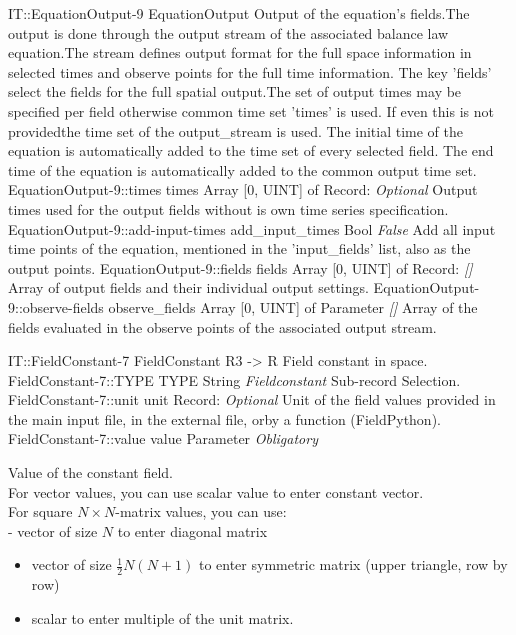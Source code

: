 \begin{RecordType}
	{IT::EquationOutput-9}
	{EquationOutput}
	{} %
	{} %
	{{{Output of the equation's fields.The output is done through the output stream of the associated balance law equation.The stream defines output format for the full space information in selected times and observe points for the full time information. The key 'fields' select the fields for the full spatial output.The set of output times may be specified  per field otherwise common time set 'times' is used. If even this is not providedthe time set of the output{\_}stream is used. The initial time of the equation is automatically added to the time set of every selected field. The end time of the equation is automatically added to the common output time set.}}}
		\RecKey
			{EquationOutput-9::times}
			{times}
			{{Array [0, UINT] of }{Record}{: }}
			{ \it{Optional} }
			{{{Output times used for the output fields without is own time series specification.}}}
		\RecKey
			{EquationOutput-9::add-input-times}
			{add{\_}input{\_}times}
			{{Bool}}
			{ \it{False} }
			{{{Add all input time points of the equation, mentioned in the 'input{\_}fields' list, also as the output points.}}}
		\RecKey
			{EquationOutput-9::fields}
			{fields}
			{{Array [0, UINT] of }{Record}{: }}
			{ \it{[]} }
			{{{Array of output fields and their individual output settings.}}}
		\RecKey
			{EquationOutput-9::observe-fields}
			{observe{\_}fields}
			{{Array [0, UINT] of }{Parameter}}
			{ \it{[]} }
			{{{Array of the fields evaluated in the observe points of the associated output stream.}}}
\end{RecordType}
\begin{RecordType}
	{IT::FieldConstant-7}
	{FieldConstant}
	{} %
	{} %
	{{{R3 -{\textgreater} R Field constant in space.}}}
		\RecKey
			{FieldConstant-7::TYPE}
			{TYPE}
			{{String}}
			{ \it{Fieldconstant} }
			{{{Sub-record Selection.}}}
		\RecKey
			{FieldConstant-7::unit}
			{unit}
			{{Record}{: }}
			{ \it{Optional} }
			{{{Unit of the field values provided in the main input file, in the external file, orby a function (FieldPython).}}}
		\RecKey
			{FieldConstant-7::value}
			{value}
			{{Parameter}}
			{ \it{Obligatory} }
			{{{{Value of the constant field.}\\{
For vector values, you can use scalar value to enter constant vector.}\\{
For square }{$N\times N$}{-matrix values, you can use:}\\{
 - vector of size }{$N$}{ to enter diagonal matrix}
}
\begin{itemize}
\item {vector of size }{$\frac12N(N+1)$}{ to enter symmetric matrix (upper triangle, row by row)}
\item {scalar to enter multiple of the unit matrix.}
\end{itemize}
}}
\end{RecordType}
